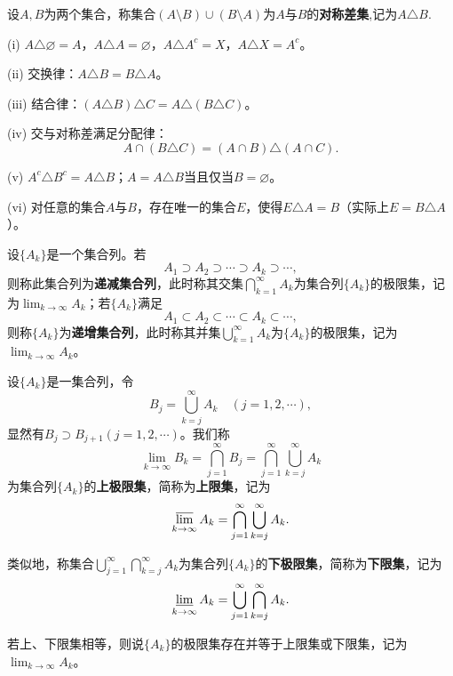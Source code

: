 \documentclass[../../main.tex]{subfiles}
\begin{document}
\begin{definition}[集合的对称差]\label{definition:集合的对称差}
  设\(A,B\)为两个集合，称集合\((A\setminus B)\cup(B\setminus A)\)为\(A\)与\(B\)的\textbf{对称差集},记为\(A\triangle B\).
\end{definition}

\begin{proposition}[集合的对称差的基本性质]\label{proposition:集合的对称差的基本性质}
  (i) \(A\triangle\varnothing = A\)，\(A\triangle A=\varnothing\)，\(A\triangle A^c = X\)，\(A\triangle X = A^c\)。

(ii) 交换律：\(A\triangle B = B\triangle A\)。

(iii) 结合律：\((A\triangle B)\triangle C = A\triangle(B\triangle C)\)。

(iv) 交与对称差满足分配律：
\[A\cap(B\triangle C)=(A\cap B)\triangle(A\cap C).\]

(v) \(A^c\triangle B^c = A\triangle B\)；\(A = A\triangle B\)当且仅当\(B = \varnothing\)。

(vi) 对任意的集合\(A\)与\(B\)，存在唯一的集合\(E\)，使得\(E\triangle A = B\)（实际上\(E = B\triangle A\)）。
\end{proposition}

\begin{definition}[递增、递减集合列]\label{definition:递增、递减集合列}
设\(\{A_k\}\)是一个集合列。若
\[A_1\supset A_2\supset\cdots\supset A_k\supset\cdots,\]
则称此集合列为\textbf{递减集合列}，此时称其交集\(\bigcap_{k = 1}^{\infty}A_k\)为集合列\(\{A_k\}\)的极限集，记为\(\lim_{k\rightarrow\infty}A_k\)；若\(\{A_k\}\)满足
\[A_1\subset A_2\subset\cdots\subset A_k\subset\cdots,\]
则称\(\{A_k\}\)为\textbf{递增集合列}，此时称其并集\(\bigcup_{k = 1}^{\infty}A_k\)为\(\{A_k\}\)的极限集，记为\(\lim_{k\rightarrow\infty}A_k\)。
\end{definition}

\begin{definition}[上、下极限集]\label{definition:上、下极限集}
  设\(\{A_k\}\)是一集合列，令
\[B_j=\bigcup_{k = j}^{\infty}A_k\quad (j = 1,2,\cdots),\]
显然有\(B_j\supset B_{j + 1}(j = 1,2,\cdots)\)。我们称
\[\lim_{k\rightarrow\infty}B_k=\bigcap_{j = 1}^{\infty}B_j=\bigcap_{j = 1}^{\infty}\bigcup_{k = j}^{\infty}A_k\]
为集合列\(\{A_k\}\)的\textbf{上极限集}，简称为\textbf{上限集}，记为
\[\varlimsup_{k\rightarrow\infty}A_k=\bigcap_{j = 1}^{\infty}\bigcup_{k = j}^{\infty}A_k.\]

类似地，称集合\(\bigcup_{j = 1}^{\infty}\bigcap_{k = j}^{\infty}A_k\)为集合列\(\{A_k\}\)的\textbf{下极限集}，简称为\textbf{下限集}，记为
\[\varliminf_{k\rightarrow\infty}A_k=\bigcup_{j = 1}^{\infty}\bigcap_{k = j}^{\infty}A_k.\]

若上、下限集相等，则说\(\{A_k\}\)的极限集存在并等于上限集或下限集，记为\(\lim_{k\rightarrow\infty}A_k\)。
\end{definition}
\end{document}
